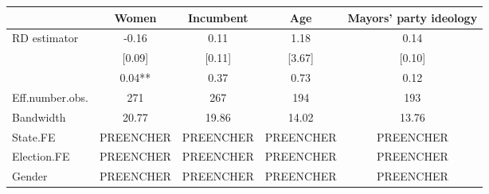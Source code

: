 \begin{table}
\fontsize{12.0pt}{14.4pt}\selectfont
\begin{tabular*}{\linewidth}{@{\extracolsep{\fill}}lcccc}
\toprule
  & Women & Incumbent & Age & Mayors' party ideology \\ 
\midrule\addlinespace[2.5pt]
RD estimator & -0.16 & 0.11 & 1.18 & 0.14 \\ 
 & [0.09] & [0.11] & [3.67] & [0.10] \\ 
{} & {0.04**} & {0.37} & {0.73} & {0.12} \\ 
Eff.number.obs. & 271 & 267 & 194 & 193 \\ 
Bandwidth & 20.77 & 19.86 & 14.02 & 13.76 \\ 
State.FE & PREENCHER & PREENCHER & PREENCHER & PREENCHER \\ 
Election.FE & PREENCHER & PREENCHER & PREENCHER & PREENCHER \\ 
Gender & PREENCHER & PREENCHER & PREENCHER & PREENCHER \\ 
\bottomrule
\end{tabular*}
\end{table}

